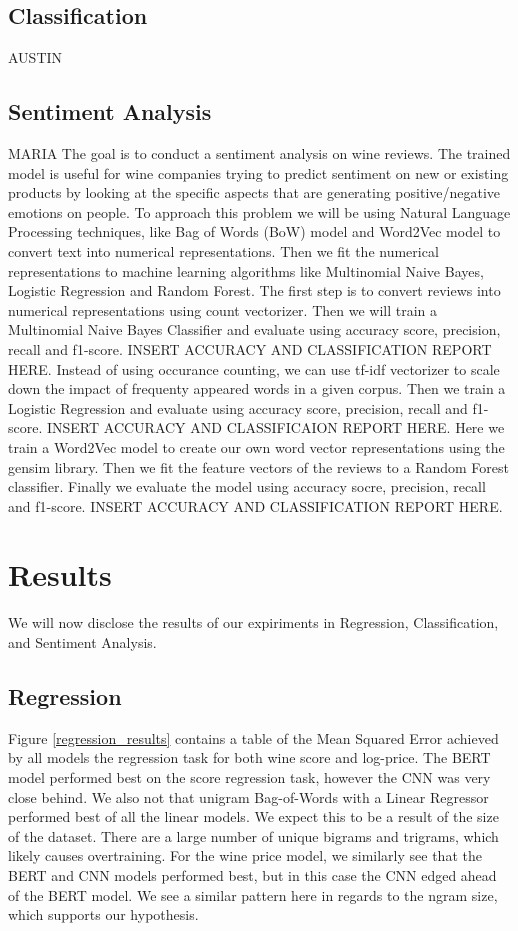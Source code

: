 \documentclass[11pt]{article}
\begin{document}
\subsection{Classification}
AUSTIN

\subsection{Sentiment Analysis}
    MARIA
    The goal is to conduct a sentiment analysis on wine reviews. The trained model is useful for wine companies trying to predict sentiment on new or existing products by looking at the specific aspects that are generating positive/negative emotions on people.   
    To approach this problem we will be using Natural Language Processing techniques, like Bag of Words (BoW) model and Word2Vec model to convert text into numerical representations. Then we fit the numerical representations to machine learning algorithms like Multinomial Naive Bayes, Logistic Regression and Random Forest. 
    The first step is to convert reviews into numerical representations using count vectorizer. Then we will train a Multinomial Naive Bayes Classifier and evaluate using accuracy score, precision, recall and f1-score. 
    INSERT ACCURACY AND CLASSIFICATION REPORT HERE.
    Instead of using occurance counting, we can use tf-idf vectorizer to scale down the impact of frequenty appeared words in a given corpus. Then we train a Logistic Regression and evaluate using accuracy score, precision, recall and f1-score. 
    INSERT ACCURACY AND CLASSIFICAION REPORT HERE. 
    Here we train a Word2Vec model to create our own word vector representations using the gensim library. Then we fit the feature vectors of the reviews to a Random Forest classifier. Finally we evaluate the model using accuracy socre, precision, recall and f1-score. 
    INSERT ACCURACY AND CLASSIFICATION REPORT HERE. 

\section{Results}
    We will now disclose the results of our expiriments in Regression, Classification, and Sentiment Analysis.

\subsection{Regression}
    Figure \ref{regression_results} contains a table of the Mean Squared Error achieved by all models the regression task for both wine score and log-price. The BERT model performed best on the score regression task, however the CNN was very close behind. We also not that unigram Bag-of-Words with a Linear Regressor performed best of all the linear models. We expect this to be a result of the size of the dataset. There are a large number of unique bigrams and trigrams, which likely causes overtraining. For the wine price model, we similarly see that the BERT and CNN models performed best, but in this case the CNN edged ahead of the BERT model. We see a similar pattern here in regards to the ngram size, which supports our hypothesis.
\end{document}
